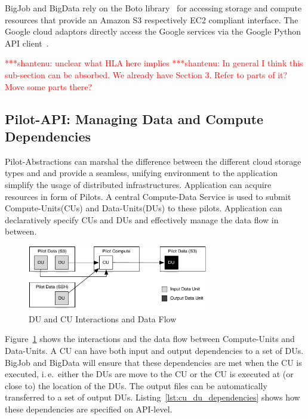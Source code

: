 \documentclass[times]{cpeauth}
\newcommand{\jhanote}[1]{ {\textcolor{red} { ***shantenu: #1 }}}
\newcommand{\jhanote}[1]{}
\newcommand{\pilots}{Pilots\xspace}
\newcommand{\computedataservice}{Compute-Data Service\xspace}
\newcommand{\computeunits}{Compute-Units\xspace}
\newcommand{\dataunits}{Data-Units\xspace}
\newcommand{\dus}{DUs\xspace}
\newcommand{\cu}{CU\xspace}
\newcommand{\cus}{CUs\xspace}
\begin{document}
BigJob and BigData rely on the Boto library~\cite{boto} for accessing storage
and compute resources that provide an Amazon S3 respectively EC2 compliant
interface. The Google cloud adaptors directly access the Google services via
the Google Python API client~\cite{google-api-client}.

 

\jhanote{unclear what HLA here implies} \jhanote{In general I think
  this sub-section can be absorbed. We already have Section 3. Refer
  to parts of it? Move some parts there?}




\subsection{Pilot-API: Managing Data and Compute Dependencies}

Pilot-Abstractions can marshal the difference between the different cloud
storage types and and provide a seamless, unifying environment to the
application simplify the usage of distributed infrastructures. Application can 
acquire resources in form of \pilots. A central \computedataservice is used to 
submit \computeunits (\cus) and \dataunits (\dus) to these pilots. Application 
can declaratively specify \cus and \dus and effectively manage the data flow 
in between. 

\begin{figure}[htbp]
	\centering
		\includegraphics[width=0.7\textwidth]{figures/data-flow.pdf}
	\caption{DU and CU Interactions and Data Flow}
	\label{fig:figures_data-flow}
\end{figure}

Figure~\ref{fig:figures_data-flow} shows the interactions and the data flow
between \computeunits and \dataunits. A \cu can have both input and output
dependencies to a set of \dus. BigJob and BigData will ensure that these
dependencies are met when the \cu is executed, i.\,e.\ either the \dus are
move to the \cu or the \cu is executed at (or close to) the location of the
\dus. The output files can be automatically transferred to a set of output
\dus. Listing~\ref{lst:cu_du_dependencies} shows how these dependencies are
specified on API-level.
\end{document}
